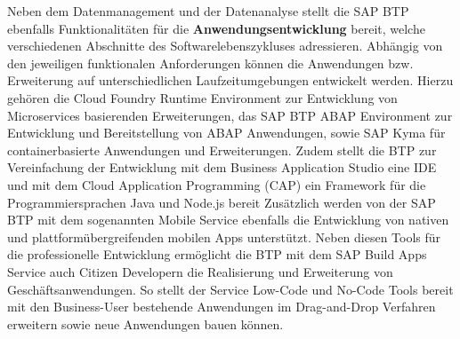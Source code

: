 Neben dem Datenmanagement und der Datenanalyse stellt die SAP BTP ebenfalls Funktionalitäten für die \textbf{Anwendungsentwicklung} bereit, welche verschiedenen Abschnitte des Softwarelebenszykluses adressieren. Abhängig von den jeweiligen funktionalen Anforderungen können die Anwendungen bzw. Erweiterung auf unterschiedlichen Laufzeitumgebungen entwickelt werden. Hierzu gehören die Cloud Foundry Runtime Environment zur Entwicklung von Microservices basierenden Erweiterungen, das SAP BTP ABAP Environment zur Entwicklung und Bereitstellung von ABAP Anwendungen, sowie SAP Kyma für containerbasierte Anwendungen und Erweiterungen. Zudem stellt die BTP zur Vereinfachung der Entwicklung mit dem Business Application Studio eine IDE und mit dem Cloud Application Programming (CAP) ein Framework für die Programmiersprachen Java und Node.js bereit \autocite[Vgl.][S. 67-69]{SEUBERT} Zusätzlich werden von der SAP BTP mit dem sogenannten Mobile Service ebenfalls die Entwicklung von nativen und plattformübergreifenden mobilen Apps unterstützt. \autocite[Vgl.][S. 217-219]{SEUBERT} Neben diesen Tools für die professionelle Entwicklung ermöglicht die BTP mit dem SAP Build Apps Service auch Citizen Developern die Realisierung und Erweiterung von Geschäftsanwendungen. So stellt der Service Low-Code und No-Code Tools bereit mit den Business-User bestehende Anwendungen im Drag-and-Drop Verfahren erweitern sowie neue Anwendungen bauen können. \autocite[Vgl.][S. 4]{SAPBUILDAPPS}


